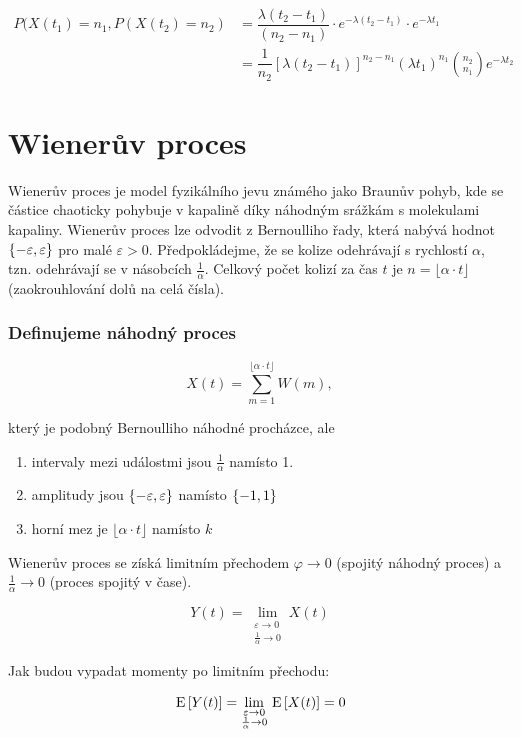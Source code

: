 \begin{align}
	P(X(t_1) = n_1, P(X(t_2)=n_2) &= \dfrac{\lambda (t_2-t_1)}{(n_2-n_1)} \cdot e^{-\lambda (t_2-t_1)} \cdot e^{-\lambda t_1} \\ &= \dfrac{1}{n_2} [\lambda(t_2-t_1)]^{n_2-n_1} (\lambda t_1)^{n_1}  {n_2 \choose n_1} e^{-\lambda t_2}
\end{align}


\section{Wienerův proces}
Wienerův proces je model fyzikálního jevu známého jako Braunův pohyb, kde se částice chaoticky pohybuje v kapalině díky náhodným srážkám s molekulami kapaliny. Wienerův proces lze odvodit z Bernoulliho řady, která nabývá hodnot $\left\{-\varepsilon,\varepsilon\right\}$ pro malé $\varepsilon>0$. Předpokládejme, že se kolize odehrávají s rychlostí $\alpha$, tzn. odehrávají se v násobcích $\frac{1}{\alpha}$. Celkový počet kolizí za čas $t$ je $n=\lfloor\alpha\cdot t\rfloor$ (zaokrouhlování dolů na celá čísla).

\subsubsection*{Definujeme náhodný proces}
\[ X(t)=\sum_{m=1}^{\lfloor\alpha\cdot t\rfloor} W(m), \]

který je podobný Bernoulliho náhodné procházce, ale

\begin{enumerate}[label=\roman*)]
\item intervaly mezi událostmi jsou $\frac{1}{\alpha}$ namísto 1.
\item amplitudy jsou $\left\{-\varepsilon,\varepsilon\right\}$ namísto $\left\{-1,1\right\}$
\item horní mez je $\lfloor\alpha\cdot t\rfloor$ namísto $k$
\end{enumerate}

Wienerův proces se získá limitním přechodem $\varphi\to 0$ (spojitý náhodný proces) a $\frac{1}{\alpha}\to 0$ (proces spojitý v čase).

\[ Y(t) = \lim_{\substack{\varepsilon\to 0\\ \frac{1}{\alpha}\to 0}} X(t) \]

Jak budou vypadat momenty po limitním přechodu:

\[ \,\mathrm{E}\left[Y(t)\right] = \lim_{\substack{\varepsilon\to 0\\ \frac{1}{\alpha}\to 0}} \,\mathrm{E}\left[X(t)\right]=0 \]

